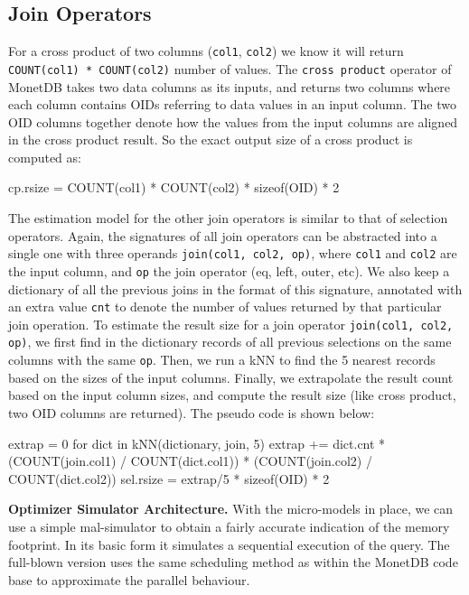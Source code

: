 \documentclass[conference]{IEEEtran}
\def\Skip{\par\medskip\nobreak\noindent}
\begin{document}
\subsection{Join Operators}
For a cross product of two columns (\texttt{\small col1}, \texttt{\small col2}) we know it will return \texttt{\small COUNT(col1) * COUNT(col2)} number of values.
The \texttt{\small cross product} operator of MonetDB takes two data columns as its inputs, and returns two columns where each column contains OIDs referring to data values in an input column.
The two OID columns together denote how the values from the input columns are aligned in the cross product result.
So the exact output size of a cross product is computed as:
\begin{verb}
cp.rsize = COUNT(col1) * COUNT(col2) * sizeof(OID) * 2
\end{verb}

The estimation model for the other join operators is similar to that of selection operators.
Again, the signatures of all join operators can be abstracted into a single one with three operands \texttt{\small join(col1, col2, op)}, where \texttt{\small col1} and \texttt{\small col2} are the input column, and \texttt{\small op} the join operator (eq, left, outer, etc).
We also keep a dictionary of all the previous joins in the format of this signature, annotated with an extra value \texttt{\small cnt} to denote the number of values returned by that particular join operation.
To estimate the result size for a join operator \texttt{\small join(col1, col2, op)}, we first find in the dictionary records of all previous selections on the same columns with the same \texttt{\small op}. 
Then, we run a kNN to find the 5 nearest records based on the sizes of the input columns.
Finally, we extrapolate the result count based on the input column sizes, and compute the result size (like cross product, two OID columns are returned).
The pseudo code is shown below:
\begin{verb}
extrap = 0
for dict in kNN(dictionary, join, 5)
  extrap += dict.cnt * (COUNT(join.col1) / COUNT(dict.col1)) * 
                       (COUNT(join.col2) / COUNT(dict.col2))
sel.rsize = extrap/5 * sizeof(OID) * 2
\end{verb}

\Skip\textbf{Optimizer Simulator Architecture.}
With the micro-models in place, we can use a simple {\sc mal}-simulator to obtain a fairly accurate indication of the memory footprint.
In its basic form it simulates a sequential execution of the query.
The full-blown version uses the same scheduling method as within the MonetDB code base to approximate the parallel behaviour.
\end{document}

